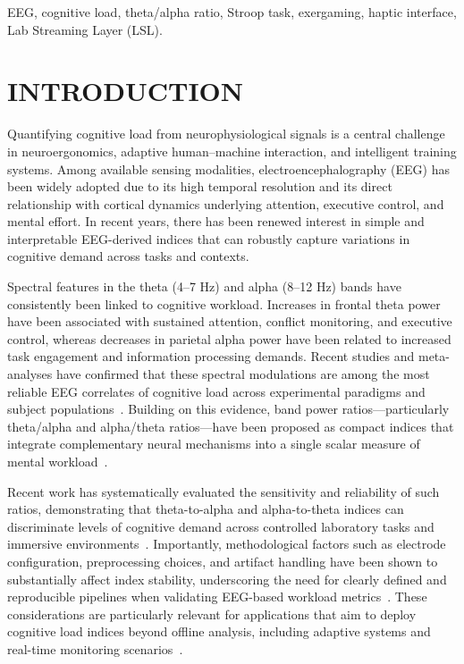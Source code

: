\documentclass[letterpaper, 10 pt, conference]{ieeeconf}
\begin{document}
\begin{keywords}
EEG, cognitive load, theta/alpha ratio, Stroop task, exergaming, haptic interface, Lab Streaming Layer (LSL).
\end{keywords}


\section{INTRODUCTION}

Quantifying cognitive load from neurophysiological signals is a central challenge in neuroergonomics, adaptive human--machine interaction, and intelligent training systems. Among available sensing modalities, electroencephalography (EEG) has been widely adopted due to its high temporal resolution and its direct relationship with cortical dynamics underlying attention, executive control, and mental effort. In recent years, there has been renewed interest in simple and interpretable EEG-derived indices that can robustly capture variations in cognitive demand across tasks and contexts.

Spectral features in the theta (4--7 Hz) and alpha (8--12 Hz) bands have consistently been linked to cognitive workload. Increases in frontal theta power have been associated with sustained attention, conflict monitoring, and executive control, whereas decreases in parietal alpha power have been related to increased task engagement and information processing demands. Recent studies and meta-analyses have confirmed that these spectral modulations are among the most reliable EEG correlates of cognitive load across experimental paradigms and subject populations~\cite{c1,c4}. Building on this evidence, band power ratios—particularly theta/alpha and alpha/theta ratios—have been proposed as compact indices that integrate complementary neural mechanisms into a single scalar measure of mental workload~\cite{c1,c7}.

Recent work has systematically evaluated the sensitivity and reliability of such ratios, demonstrating that theta-to-alpha and alpha-to-theta indices can discriminate levels of cognitive demand across controlled laboratory tasks and immersive environments~\cite{c1,c2,c3}. Importantly, methodological factors such as electrode configuration, preprocessing choices, and artifact handling have been shown to substantially affect index stability, underscoring the need for clearly defined and reproducible pipelines when validating EEG-based workload metrics~\cite{c4,c6}. These considerations are particularly relevant for applications that aim to deploy cognitive load indices beyond offline analysis, including adaptive systems and real-time monitoring scenarios~\cite{c10}.
\end{document}
